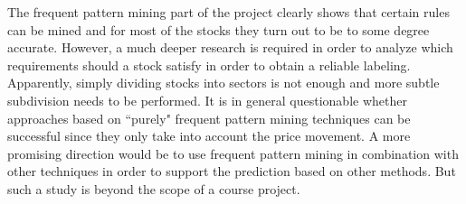 \documentclass{llncs}
\begin{document}
The frequent pattern mining part of the project clearly shows that certain rules can be mined and for most of the stocks they turn out to be to some degree accurate. However, a much deeper research is required in order to analyze which requirements should a stock satisfy in order to obtain a reliable labeling. Apparently, simply dividing stocks into sectors is not enough and more subtle subdivision needs to be performed. It is in general questionable whether approaches based on ``purely" frequent pattern mining techniques can be successful since they only take into account the price movement. A more promising direction would be to use frequent pattern mining in combination with other techniques in order to support the prediction based on other methods. But such a study is beyond the scope of a course project.  
%

\end{document}
